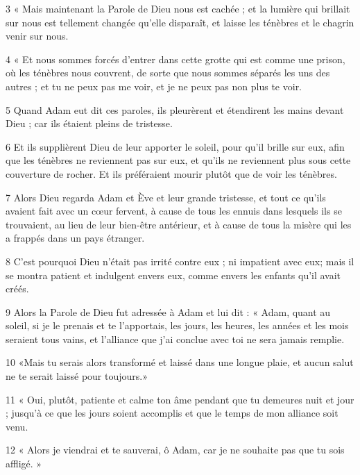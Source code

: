 \par 3 « Mais maintenant la Parole de Dieu nous est cachée ; et la lumière qui brillait sur nous est tellement changée qu'elle disparaît, et laisse les ténèbres et le chagrin venir sur nous.

\par 4 « Et nous sommes forcés d'entrer dans cette grotte qui est comme une prison, où les ténèbres nous couvrent, de sorte que nous sommes séparés les uns des autres ; et tu ne peux pas me voir, et je ne peux pas non plus te voir.

\par 5 Quand Adam eut dit ces paroles, ils pleurèrent et étendirent les mains devant Dieu ; car ils étaient pleins de tristesse.

\par 6 Et ils supplièrent Dieu de leur apporter le soleil, pour qu'il brille sur eux, afin que les ténèbres ne reviennent pas sur eux, et qu'ils ne reviennent plus sous cette couverture de rocher. Et ils préféraient mourir plutôt que de voir les ténèbres.

\par 7 Alors Dieu regarda Adam et Ève et leur grande tristesse, et tout ce qu'ils avaient fait avec un cœur fervent, à cause de tous les ennuis dans lesquels ils se trouvaient, au lieu de leur bien-être antérieur, et à cause de tous la misère qui les a frappés dans un pays étranger.

\par 8 C'est pourquoi Dieu n'était pas irrité contre eux ; ni impatient avec eux; mais il se montra patient et indulgent envers eux, comme envers les enfants qu'il avait créés.

\par 9 Alors la Parole de Dieu fut adressée à Adam et lui dit : « Adam, quant au soleil, si je le prenais et te l'apportais, les jours, les heures, les années et les mois seraient tous vains, et l’alliance que j’ai conclue avec toi ne sera jamais remplie.

\par 10 «Mais tu serais alors transformé et laissé dans une longue plaie, et aucun salut ne te serait laissé pour toujours.»

\par 11 « Oui, plutôt, patiente et calme ton âme pendant que tu demeures nuit et jour ; jusqu'à ce que les jours soient accomplis et que le temps de mon alliance soit venu.

\par 12 « Alors je viendrai et te sauverai, ô Adam, car je ne souhaite pas que tu sois affligé. »

